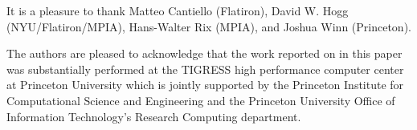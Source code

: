 \documentclass[modern, letterpaper]{aastex62}
\newcommand{\apogee}{\project{\acronym{APOGEE}}}
\newcommand{\sdssiv}{\project{\acronym{SDSS-IV}}}
\begin{document}
\acknowledgements

It is a pleasure to thank
Matteo Cantiello (Flatiron),
David W. Hogg (NYU/Flatiron/MPIA),
Hans-Walter Rix (MPIA),
and Joshua Winn (Princeton).

The authors are pleased to acknowledge that the work reported on in this
paper was substantially performed at the TIGRESS high performance computer
center at Princeton University which is jointly supported by the Princeton
Institute for Computational Science and Engineering and the Princeton
University Office of Information Technology's Research Computing department.


\facility{\sdssiv, \apogee}



\end{document}
